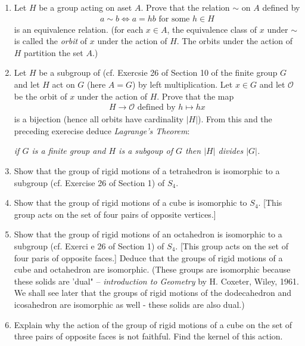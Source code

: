 \documentclass[10pt,a4paper]{report}
\begin{document}
\begin{enumerate}
	\item Let $H$ be a group acting on aset $A$.  Prove that the relation $\sim$ on $A$ defined by 
	\begin{align*}
		a \sim b \iff a =hb \text{ for some } h \in H
	\end{align*}is an equivalence relation.  (for each $x \in A$, the equivalence class of $x$ under $\sim$ is called the \textit{orbit} of $x$ under the action of $H$.  The orbits under the action of $H$ partition the set $A$.)
	
	\item Let $H$ be a subgroup of (cf. Exercsie 26 of Section 10 of the finite group $G$ and let $H$ act on $G$ (here $A=G$) by left multiplication.  Let $x \in G$ and let $\mathcal{O}$ be the orbit of $x$ under the action of $H$.  Prove that the map 
	\begin{align*}
		H \to \mathcal{O} \text{ defined by } h \mapsto hx
	\end{align*}is a bijection (hence all orbits have cardinality $|H|$).  From this and the preceding exerecise deduce \textit{Lagrange's Theorem}:
	\begin{center}
		\textit{if $G$ is a finite group and $H$ is a subgoup of $G$ then $|H|$ divides $|G|$.}
	\end{center}
	
	\item Show that the group of rigid motions of a tetrahedron is isomorphic to a subgroup (cf. Exercise 26 of Section 1) of $S_4$.
	
	\item Show that the group of rigid motions of a cube is isomorphic to $S_4$.  [This group acts on the set of four pairs of opposite vertices.]
	
	\item Show that the group of rigid motions of an octahedron is isomorphic to a subgroup (cf.  Exerci e 26 of Section 1) of $S_4$. [This group acts on the set of four paris of opposite faces.]  Deduce that the groups of rigid motions of a cube and octahedron are isomorphic.  (These groups are isomorphic because these solids are 'dual" -- \textit{introduction to Geometry} by H. Coxeter, Wiley, 1961.  We shall see later that the groups of rigid motions of the dodecahedron and icosahedron are isomorphic as well - these solids are also dual.)
	
	\item Explain why the action of the group of rigid motions of a cube on the set of three pairs of opposite faces is not faithful.  Find the kernel of this action.
	
\end{enumerate}
\end{document}
